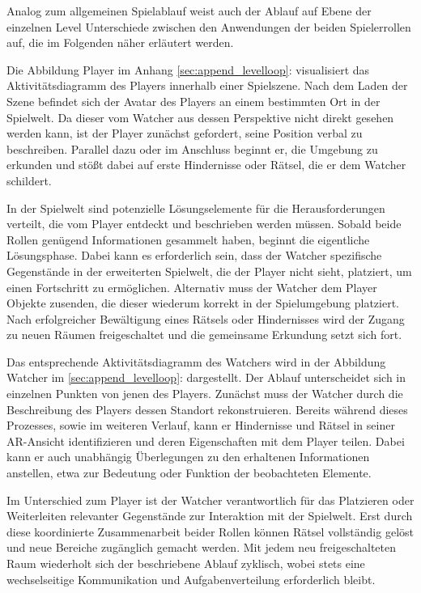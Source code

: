 Analog zum allgemeinen Spielablauf weist auch der Ablauf auf Ebene der einzelnen Level Unterschiede zwischen den Anwendungen der beiden Spielerrollen auf, die im Folgenden näher erläutert werden. 

Die Abbildung Player im Anhang \ref{sec:append_levelloop}:  visualisiert das Aktivitätsdiagramm des Players innerhalb einer Spielszene. Nach dem Laden der Szene befindet sich der Avatar des Players an einem bestimmten Ort in der Spielwelt. Da dieser vom Watcher aus dessen Perspektive nicht direkt gesehen werden kann, ist der Player zunächst gefordert, seine Position verbal zu beschreiben. Parallel dazu oder im Anschluss beginnt er, die Umgebung zu erkunden und stößt dabei auf erste Hindernisse oder Rätsel, die er dem Watcher schildert. 

In der Spielwelt sind potenzielle Lösungselemente für die Herausforderungen verteilt, die vom Player entdeckt und beschrieben werden müssen. Sobald beide Rollen genügend Informationen gesammelt haben, beginnt die eigentliche Lösungsphase. Dabei kann es erforderlich sein, dass der Watcher spezifische Gegenstände in der erweiterten Spielwelt, die der Player nicht sieht, platziert, um einen Fortschritt zu ermöglichen. Alternativ muss der Watcher dem Player Objekte zusenden, die dieser wiederum korrekt in der Spielumgebung platziert. Nach erfolgreicher Bewältigung eines Rätsels oder Hindernisses wird der Zugang zu neuen Räumen freigeschaltet und die gemeinsame Erkundung setzt sich fort.

Das entsprechende Aktivitätsdiagramm des Watchers wird in der Abbildung Watcher im \ref{sec:append_levelloop}:  dargestellt. Der Ablauf unterscheidet sich in einzelnen Punkten von jenen des Players. Zunächst muss der Watcher durch die Beschreibung des Players dessen Standort rekonstruieren. Bereits während dieses Prozesses, sowie im weiteren Verlauf, kann er Hindernisse und Rätsel in seiner \ac{AR}-Ansicht identifizieren und deren Eigenschaften mit dem Player teilen. Dabei kann er auch unabhängig Überlegungen zu den erhaltenen Informationen anstellen, etwa zur Bedeutung oder Funktion der beobachteten Elemente.

Im Unterschied zum Player ist der Watcher verantwortlich für das Platzieren oder Weiterleiten relevanter Gegenstände zur Interaktion mit der Spielwelt. Erst durch diese koordinierte Zusammenarbeit beider Rollen können Rätsel vollständig gelöst und neue Bereiche zugänglich gemacht werden. Mit jedem neu freigeschalteten Raum wiederholt sich der beschriebene Ablauf zyklisch, wobei stets eine wechselseitige Kommunikation und Aufgabenverteilung erforderlich bleibt.


